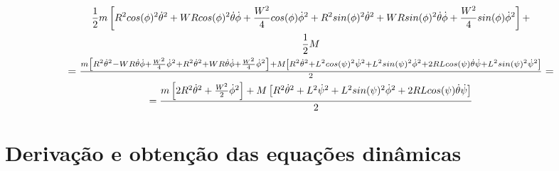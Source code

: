 \documentclass[10pt]{article}
\begin{document}
\begin{equation}
\begin{gathered}
    \frac{1}{2}m \left[R^2cos(\phi)^2\dot{\theta}^2 + WR cos(\phi)^2\dot{\theta}\dot{\phi} + \frac{W^2}{4}cos(\phi)\dot{\phi}^2 + R^2sin(\phi)^2\dot{\theta}^2 + WR sin(\phi)^2\dot{\theta}\dot{\phi} + \frac{W^2}{4}sin(\phi)\dot{\phi}^2\right] + \\
    \frac{1}{2}M \\
    \scalebox{1.1}{$
    = \frac{m \left[R^2\dot{\theta}^2 - WR\dot{\theta}\dot{\phi} + \frac{W^2}{4}\dot{\phi}^2 + R^2\dot{\theta}^2 + WR\dot{\theta}\dot{\phi} + \frac{W^2}{4}\dot{\phi}^2\right] + M \left[ R^2 \dot{\theta}^2 + L^2cos(\psi)^2\dot{\psi}^2 + L^2 sin(\psi)^2 \dot{\phi}^2 + 2RL cos(\psi)\dot{\theta}\dot{\psi} + L^2sin(\psi)^2\dot{\psi}^2 \right]}{2} =
    $}\\
    = \frac{m \left[2R^2\dot{\theta}^2 + \frac{W^2}{2}\dot{\phi}^2\right] + M \left[ R^2 \dot{\theta}^2 + L^2\dot{\psi}^2 + L^2 sin(\psi)^2 \dot{\phi}^2 + 2RL cos(\psi)\dot{\theta}\dot{\psi}\right]}{2}
\end{gathered}
\end{equation}

\section{Derivação e obtenção das equações dinâmicas}
\end{document}
